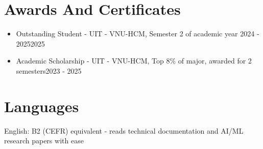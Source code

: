 \documentclass[10pt, a4paper]{article}
\newcommand{\award}[3]{\item #1 {\color{MutedText}- #2}\hfill{\color{MutedText}#3}}
\begin{document}
\section{Awards And Certificates}
\begin{itemize}
  \award{Outstanding Student}{UIT - VNU-HCM, Semester 2 of academic year 2024 - 2025}{2025}
  \award{Academic Scholarship}{UIT - VNU-HCM, Top 8\% of major, awarded for 2 semesters}{2023 - 2025}
\end{itemize}

\section{Languages}
English: B2 (CEFR) equivalent - reads technical documentation and AI/ML research papers with ease\par
\end{document}
